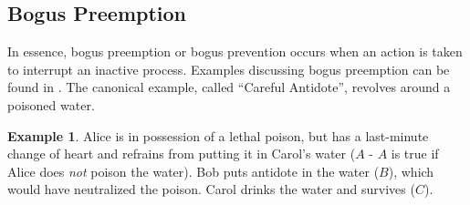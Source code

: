 \documentclass[11pt,a4paper]{book}
\theoremstyle{definition}
\theoremstyle{definition}
\newtheorem{example}{Example}[section]
\theoremstyle{definition}
\theoremstyle{remark}
\begin{document}
\subsection{Bogus Preemption}


In essence, bogus preemption or bogus prevention occurs when an action is taken to interrupt an inactive process.
Examples discussing bogus preemption can be found in \parencite{halpern2011actual,baumgartner2013regularity,halpern2015graded,weslake2015partial,chockler2015causal,blanchard2017cause,bochman2018actual,beckers2018principled,denecker2018causal,denecker2019explaining}.
The canonical example, called ``Careful Antidote'', revolves around a poisoned water.
\begin{example}
\label{ex:bogus-preemption-0}
Alice is in possession of a lethal poison, but has a last-minute change of heart and refrains from putting it in Carol's water ($A$ - $A$ is true if Alice does \emph{not} poison the water). Bob puts antidote in the water ($B$), which would have neutralized the poison. Carol drinks the water and survives ($C$).

\begin{center}
\end{center}
\end{example}
\end{document}
